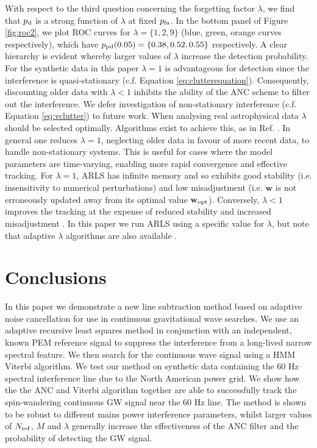 \documentclass[pra,superscriptaddress,reprint,amsmath,amssymb,nofootinbib]{revtex4-2}
\begin{document}
With respect to the third question concerning the forgetting factor $\lambda$, we find that $p_{\rm d}$ is a strong function of $\lambda$ at fixed $p_{\rm fa}$. In the bottom panel of Figure \ref{fig:roc2}, we plot ROC curves for $\lambda = \{1,2,9\}$ (blue, green, orange curves respectively), which have $p_{\rm pd} (0.05) = \{0.38, 0.52, 0.55\}$ respectively. A clear hierarchy is evident whereby larger values of $\lambda$ increase the detection probability. For the synthetic data in this paper $\lambda=1$ is advantageous for detection since the interference is quasi-stationary (c.f. Equation \ref{eq:clutterequation}). Consequently, discounting older data with $\lambda < 1$ inhibits the ability of the ANC scheme to filter out the interference. We defer investigation of non-stationary interference (c.f. Equation \ref{eq:vclutter}) to future work. When analysing real astrophysical data $\lambda$ should be selected optimally. Algorithms exist to achieve this, as in Ref. \citep{6349749}. In general one reduces $\lambda=1$, neglecting older data in favour of more recent data, to handle non-stationary systems. This is useful for cases where the model parameters are time-varying, enabling more rapid convergence and effective tracking. For $\lambda = 1$, ARLS has infinite memory and so exhibits good stability (i.e. insensitivity to numerical perturbations) and low misadjustment (i.e. $\mathbf{w}$ is not erroneously updated away from its optimal value $\mathbf{w}_{\rm opt}$). Conversely, $\lambda < 1$ improves the tracking at the expense of reduced stability and increased misadjustment \citep{Ciochina5206117}. In this paper we run ARLS using a specific value for $\lambda$, but note that adaptive $\lambda$ algorithms are also available \citep{app12042077,1468506,4639569}. \newline 




\section{Conclusions}\label{sec:conclusions}
In this paper we demonstrate a new line subtraction method based on adaptive noise cancellation for use in continuous gravitational wave searches. We use an adaptive recursive least squares method in conjunction with an independent, known PEM reference signal to suppress the interference from a long-lived narrow spectral feature. We then search for the continuous wave signal using a HMM Viterbi algorithm. We test our method on synthetic data containing the 60 Hz spectral interference line due to the North American power grid. We show how the the ANC and Viterbi algorithm together are able to successfully track the spin-wandering continuous GW signal near the 60 Hz line. The method is shown to be robust to different mains power interference parameters, whilst larger values of $N_{\rm ref}$, $M$ and $\lambda$ generally increase the effectiveness of the ANC filter and the probability of detecting the GW signal.
\end{document}

